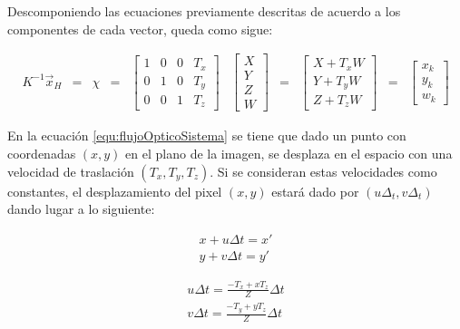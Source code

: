 Descomponiendo las ecuaciones previamente descritas de acuerdo a los componentes de cada vector, queda como sigue:

\begin{equation}\label{equ:homografiaH}
    \begin{aligned}
    K^{-1}\vec{x}_H&=&\chi&=&\left[\begin{array}{cccc}
    1&0&0&T_x\\
    0&1&0&T_y\\
    0&0&1&T_z
\end{array}\right]&\left[\begin{array}{c}
     X\\
     Y\\
     Z\\
     W
\end{array}\right]&=&\left[\begin{array}{c}
X+T_xW\\
Y+T_yW\\
Z+T_zW
\end{array}\right]&=&\left[\begin{array}{c}
     x_k\\
     y_k\\
     w_k
\end{array}\right]
\end{aligned}
\end{equation}

En la ecuación \ref{equ:flujoOpticoSistema} se tiene que dado un punto con coordenadas $(x,y)$ en el plano de la imagen, se desplaza en el espacio con una velocidad de traslación $(T_x,T_y,T_z)$. Si se consideran estas velocidades como constantes, el desplazamiento del pixel $(x,y)$ estará dado por $(u\Delta_t,v\Delta_t)$ dando lugar a lo siguiente:

\begin{equation}
\label{equ:stateNext}
    \begin{aligned}
        x+u\Delta t = x'\\
        y+v\Delta t = y'
    \end{aligned}
\end{equation}

\begin{equation}
\label{equ:flowVelocityDeltaT}
    \begin{aligned}
        u\Delta t= \frac{-T_x + xT_z}{Z}\Delta t\\
        v\Delta t = \frac{-T_y + yT_z}{Z}\Delta t
    \end{aligned}
\end{equation}

